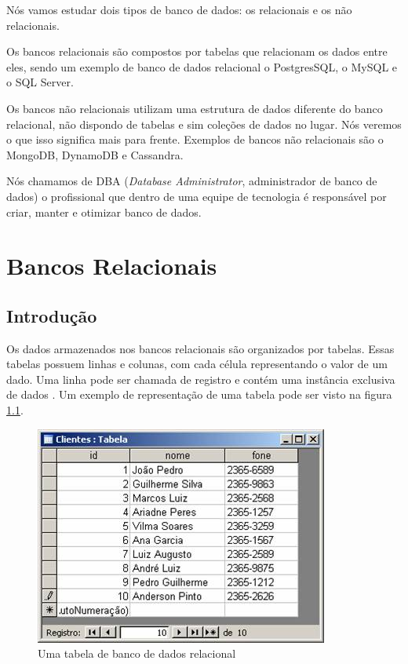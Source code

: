 \documentclass[
	12pt,				%
	openright,			%
	oneside,			%
	a4paper,			%
	english,			%
	french,				%
	spanish,			%
	brazil,				%
	]{abntex2}
\begin{document}
Nós vamos estudar dois tipos de banco de dados: os relacionais e os não relacionais.

Os bancos relacionais são compostos por tabelas que relacionam os dados entre eles, sendo um exemplo de banco de dados relacional o PostgresSQL, o MySQL e o SQL Server.

Os bancos não relacionais utilizam uma estrutura de dados diferente do banco relacional, não dispondo de tabelas e sim coleções de dados no lugar. Nós veremos o que isso significa mais para frente. Exemplos de bancos não relacionais são o MongoDB, DynamoDB e Cassandra.

Nós chamamos de DBA (\textit{Database Administrator}, administrador de banco de dados) o profissional que dentro de uma equipe de tecnologia é responsável por criar, manter e otimizar banco de dados.

\part{Bancos Relacionais}

\chapter{Introdução}

Os dados armazenados nos bancos relacionais são organizados por tabelas. Essas tabelas possuem linhas e colunas, com cada célula representando o valor de um dado. Uma linha pode ser chamada de registro e contém uma instância exclusiva de dados \cite{sqlenosql}. Um exemplo de representação de uma tabela pode ser visto na figura \ref{fig:tabelarelacional}.

\begin{figure}[h!]
  \includegraphics[scale=1]{Imagens/tabela.jpg}
  \caption{Uma tabela de banco de dados relacional}
  \label{fig:tabelarelacional}
\end{figure}
\end{document}
